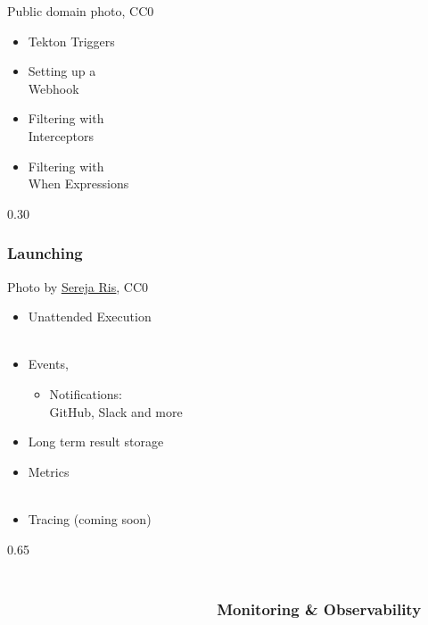 \documentclass[aspectratio=169,11pt,hyperref={colorlinks=true}]{beamer}
\begin{document}
\begin{lgrayframerpic}{Public domain photo, CC0}%
  {%
  \begin{itemize}
    \item Tekton Triggers
    \item Setting up a\\Webhook
    \item Filtering with\\Interceptors
    \item Filtering with\\When Expressions
  \end{itemize}
  }%
  {0.30}
  \frametitle{Launching}
\end{lgrayframerpic}


\begin{lpicrblack}{%
  Photo by \href{https://unsplash.com/@serejaris}{\underline{Sereja Ris}}, CC0
  }%
  {%
  \begin{itemize}
    \item Unattended Execution \\~
    \item Events, 
    \begin{itemize}
      \item Notifications:\\GitHub, Slack and more
    \end{itemize}
    \item Long term result storage
    \item Metrics \\~
    \item Tracing (coming soon)
  \end{itemize}
  }%
  {0.65}%
  \frametitle{~~~~~~~~~~~~~~~~~~~~~~~~~~~~~~~~~~~~~~~~~~~~~~~~~~~~~~~~~~~~~~~~~~~~~~~~~~~~~~Monitoring \& Observability}
\end{lpicrblack}
\end{document}
